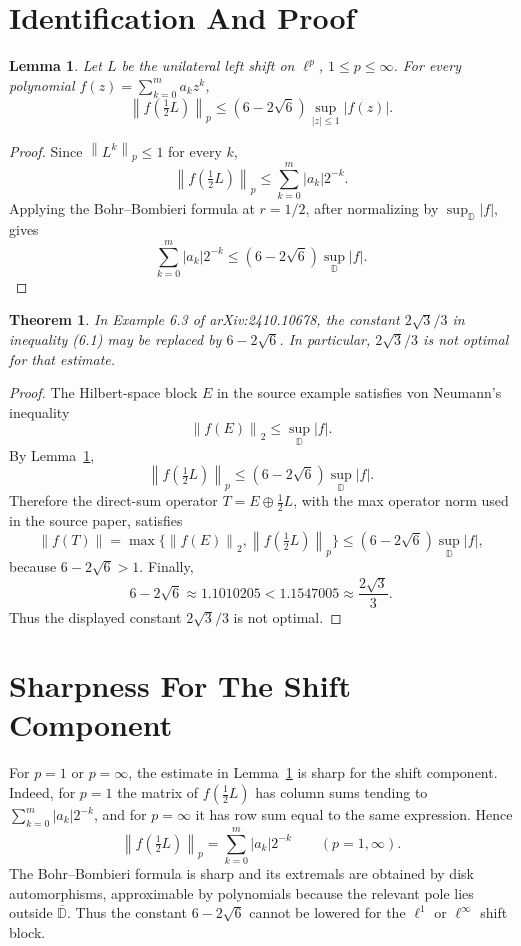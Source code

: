 \documentclass[11pt]{article}
\newtheorem{theorem}{Theorem}
\newtheorem{lemma}{Lemma}
\newcommand{\D}{\mathbb D}
\newcommand{\norm}[1]{\left\lVert #1\right\rVert}
\begin{document}
\section*{Identification And Proof}

\begin{lemma}
\label{lem:shift-majorant}
Let \(L\) be the unilateral left shift on \(\ell^p\), \(1\le p\le\infty\).
For every polynomial \(f(z)=\sum_{k=0}^m a_kz^k\),
\[
  \norm{f(\tfrac12 L)}_p
  \leq (6-2\sqrt6)\sup_{|z|\le1}|f(z)|.
\]
\end{lemma}

\begin{proof}
Since \(\norm{L^k}_p\le1\) for every \(k\),
\[
  \norm{f(\tfrac12 L)}_p
  \leq \sum_{k=0}^m |a_k|2^{-k}.
\]
Applying the Bohr--Bombieri formula at \(r=1/2\), after normalizing by
\(\sup_{\D}|f|\), gives
\[
  \sum_{k=0}^m |a_k|2^{-k}
  \leq (6-2\sqrt6)\sup_{\D}|f|.
\]
\end{proof}

\begin{theorem}
\label{thm:not-optimal}
In Example 6.3 of arXiv:2410.10678, the constant \(2\sqrt3/3\) in inequality
(6.1) may be replaced by \(6-2\sqrt6\).  In particular, \(2\sqrt3/3\) is not
optimal for that estimate.
\end{theorem}

\begin{proof}
The Hilbert-space block \(E\) in the source example satisfies von Neumann's
inequality
\[
  \norm{f(E)}_2\le \sup_{\D}|f|.
\]
By Lemma~\ref{lem:shift-majorant},
\[
  \norm{f(\tfrac12L)}_p
  \leq (6-2\sqrt6)\sup_{\D}|f|.
\]
Therefore the direct-sum operator \(T=E\oplus \tfrac12L\), with the max
operator norm used in the source paper, satisfies
\[
  \norm{f(T)}
  = \max\{\norm{f(E)}_2,\norm{f(\tfrac12 L)}_p\}
  \leq (6-2\sqrt6)\sup_{\D}|f|,
\]
because \(6-2\sqrt6>1\).  Finally,
\[
  6-2\sqrt6 \approx 1.1010205
  < 1.1547005\approx \frac{2\sqrt3}{3}.
\]
Thus the displayed constant \(2\sqrt3/3\) is not optimal.
\end{proof}

\section*{Sharpness For The Shift Component}

For \(p=1\) or \(p=\infty\), the estimate in Lemma~\ref{lem:shift-majorant}
is sharp for the shift component.  Indeed, for \(p=1\) the matrix of
\(f(\tfrac12 L)\) has column sums tending to
\(\sum_{k=0}^m |a_k|2^{-k}\), and for \(p=\infty\) it has row sum equal to
the same expression.  Hence
\[
  \norm{f(\tfrac12 L)}_p=\sum_{k=0}^m |a_k|2^{-k}
  \qquad (p=1,\infty).
\]
The Bohr--Bombieri formula is sharp and its extremals are obtained by disk
automorphisms, approximable by polynomials because the relevant pole lies
outside \(\overline{\D}\).  Thus the constant \(6-2\sqrt6\) cannot be lowered
for the \(\ell^1\) or \(\ell^\infty\) shift block.
\end{document}
